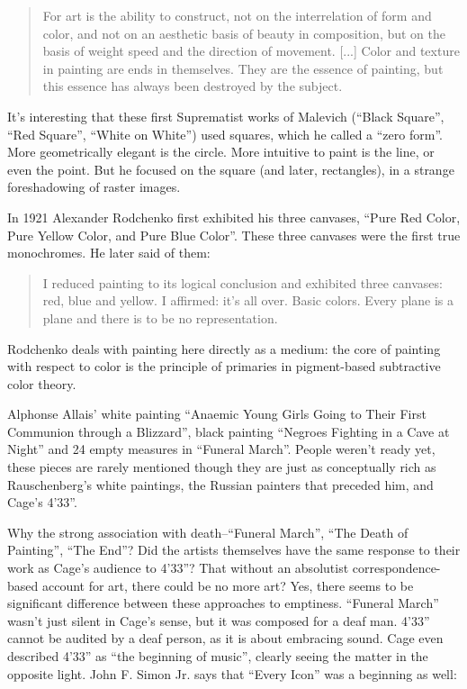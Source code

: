 \documentclass{thesis}
\begin{document}
	\begin{quote}
	For art is the ability to construct, not on the interrelation of form and color, and not on an aesthetic basis of beauty in composition, but on the basis of weight speed and the direction of movement. [...] Color and texture in painting are ends in themselves. They are the essence of painting, but this essence has always been destroyed by the subject.
	\end{quote}
	
	It's interesting that these first Suprematist works of Malevich (``Black Square'', ``Red Square'', ``White on White'') used squares, which he called a ``zero form''. More geometrically elegant is the circle. More intuitive to paint is the line, or even the point. But he focused on the square (and later, rectangles), in a strange foreshadowing of raster images.
	
	\cite{moma_rodchenko_1998}
	In 1921 Alexander Rodchenko first exhibited his three canvases, ``Pure Red Color, Pure Yellow Color, and Pure Blue Color''. These three canvases were the first true monochromes. He later said of them:
	
	\begin{quote}
	I reduced painting to its logical conclusion and exhibited three canvases: red, blue and yellow. I affirmed: it's all over. Basic colors. Every plane is a plane and there is to be no representation.
	\end{quote}
	
	Rodchenko deals with painting here directly as a medium: the core of painting with respect to color is the principle of primaries in pigment-based subtractive color theory.
	
	Alphonse Allais' white painting ``Anaemic Young Girls Going to Their First Communion through a Blizzard'', black painting ``Negroes Fighting in a Cave at Night'' and 24 empty measures in ``Funeral March''. People weren't ready yet, these pieces are rarely mentioned though they are just as conceptually rich as Rauschenberg's white paintings, the Russian painters that preceded him, and Cage's 4'33''.
	
	Why the strong association with death--``Funeral March'', ``The Death of Painting'', ``The End''? Did the artists themselves have the same response to their work as Cage's audience to 4'33''? That without an absolutist correspondence-based account for art, there could be no more art? Yes, there seems to be significant difference between these approaches to emptiness. ``Funeral March'' wasn't just silent in Cage's sense, but it was composed for a deaf man. 4'33'' cannot be audited by a deaf person, as it is about embracing sound. Cage even described 4'33'' as ``the beginning of music'', clearly seeing the matter in the opposite light. John F. Simon Jr. says that ``Every Icon'' was a beginning as well:
	
\end{document}
